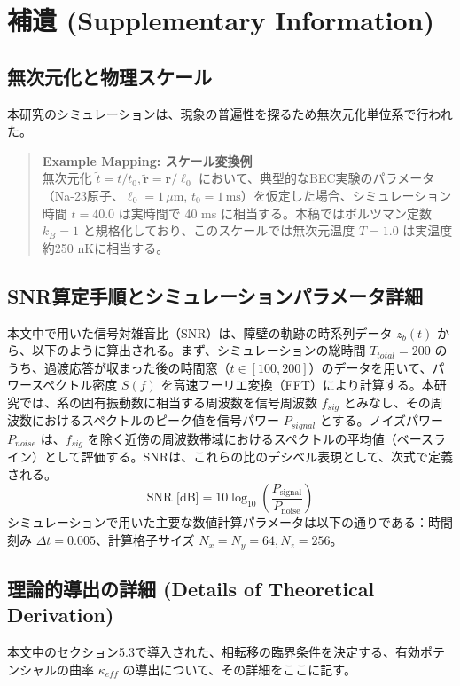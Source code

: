 \documentclass[a4paper,11pt,ja=standard,lualatex]{bxjsarticle}
\begin{document}
\FloatBarrier
\appendix

\section{補遺 (Supplementary Information)}

\subsection{無次元化と物理スケール}
本研究のシミュレーションは、現象の普遍性を探るため無次元化単位系で行われた。
\begin{quote}
\textbf{Example Mapping: スケール変換例} \\
無次元化 $\tilde t = t/t_0, \tilde{\mathbf{r}} = \mathbf{r}/\ell_0$ において、典型的なBEC実験のパラメータ（Na-23原子、$\ell_0 = 1\,\mu\text{m}$, $t_0 = 1\,\text{ms}$）を仮定した場合、シミュレーション時間 $t=40.0$ は実時間で 40 ms に相当する。本稿ではボルツマン定数 $k_B=1$ と規格化しており、このスケールでは無次元温度 $T=1.0$ は実温度約250 nKに相当する。
\end{quote}

\subsection{SNR算定手順とシミュレーションパラメータ詳細}
本文中で用いた信号対雑音比（SNR）は、障壁の軌跡の時系列データ $z_b(t)$ から、以下のように算出される。まず、シミュレーションの総時間 $T_{total}=200$ のうち、過渡応答が収まった後の時間窓（$t \in [100, 200]$）のデータを用いて、パワースペクトル密度 $S(f)$ を高速フーリエ変換（FFT）により計算する。本研究では、系の固有振動数に相当する周波数を信号周波数 $f_{sig}$ とみなし、その周波数におけるスペクトルのピーク値を信号パワー $P_{signal}$ とする。ノイズパワー $P_{noise}$ は、$f_{sig}$ を除く近傍の周波数帯域におけるスペクトルの平均値（ベースライン）として評価する。SNRは、これらの比のデシベル表現として、次式で定義される。
\begin{equation}
    \text{SNR [dB]} = 10 \log_{10}\left(\frac{P_{\text{signal}}}{P_{\text{noise}}}\right)
\end{equation}
シミュレーションで用いた主要な数値計算パラメータは以下の通りである：時間刻み $\Delta t = 0.005$、計算格子サイズ $N_x=N_y=64, N_z=256$。

\subsection{理論的導出の詳細 (Details of Theoretical Derivation)}
本文中のセクション5.3で導入された、相転移の臨界条件を決定する、有効ポテンシャルの曲率 $\kappa_{eff}$ の導出について、その詳細をここに記す。
\end{document}
